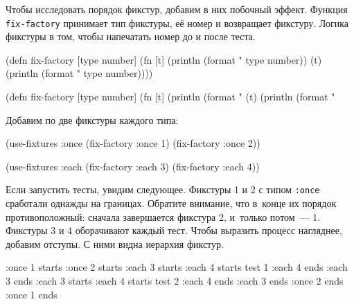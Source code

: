 Чтобы исследовать порядок фикстур, добавим в них побочный эффект. Функция
\verb|fix-factory| принимает тип фикстуры, её номер и возвращает
фикстуру. Логика фикстуры в том, чтобы напечатать номер до и после теста.


\ifx\devicetype\mobile

\begin{english}
  \begin{clojure}
(defn fix-factory [type number]
  (fn [t]
    (println (format "%
               type number))
    (t)
    (println (format "%
               type number))))
  \end{clojure}
\end{english}

\else

\begin{english}
  \begin{clojure}
(defn fix-factory [type number]
  (fn [t]
    (println (format "%
    (t)
    (println (format "%
  \end{clojure}
\end{english}

\fi

\noindent
Добавим по две фикстуры каждого типа:

\begin{english}
  \begin{clojure}
(use-fixtures :once
  (fix-factory :once 1)
  (fix-factory :once 2))

(use-fixtures :each
  (fix-factory :each 3)
  (fix-factory :each 4))
  \end{clojure}
\end{english}

Если запустить тесты, увидим следующее. Фикстуры 1 и 2 с типом \verb|:once|
сработали однажды на границах. Обратите внимание, что в~конце их порядок
противоположный: сначала завершается фикстура 2, и~только потом~--- 1. Фикстуры 3 и 4
оборачивают каждый тест. Чтобы выразить процесс нагляднее, добавим отступы. С
ними видна иерархия фикстур.


\begin{english}
  \begin{clojure}
:once 1 starts
  :once 2 starts
    :each 3 starts
      :each 4 starts
        test 1
      :each 4 ends
    :each 3 ends
    :each 3 starts
      :each 4 starts
        test 2
      :each 4 ends
    :each 3 ends
  :once 2 ends
:once 1 ends
  \end{clojure}
\end{english}

